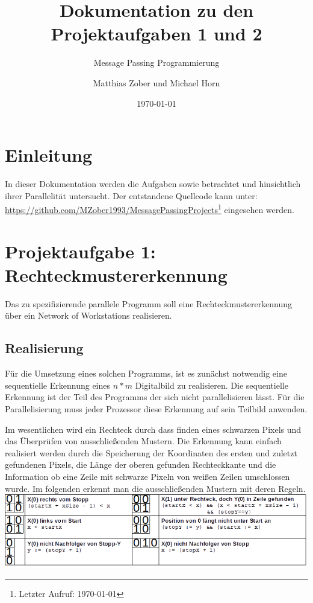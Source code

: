 	
					
\title{Dokumentation zu den Projektaufgaben 1 und 2}
\subtitle{Message Passing Programmierung}

\author{Matthias Zober und Michael Horn}
\date{\today}

\maketitle

\tableofcontents
\pagebreak

\section{Einleitung}
In dieser Dokumentation werden die Aufgaben  sowie  betrachtet und hinsichtlich ihrer Parallelität untersucht.
Der entstandene Quellcode kann unter:\\
\url{https://github.com/MZober1993/MessagePassingProjects}\footnote{Letzter Aufruf: \today}
eingesehen werden.
\section{Projektaufgabe 1: Rechteckmustererkennung}
Das zu spezifizierende parallele Programm soll eine Rechteckmustererkennung über ein Network of Workstations realisieren.
\subsection{Realisierung}

Für die Umsetzung eines solchen Programms, ist es zunächst notwendig eine sequentielle Erkennung eines $n*m$ Digitalbild zu realisieren.
Die sequentielle Erkennung ist der Teil des Programms der sich nicht parallelisieren lässt. Für die Parallelisierung muss jeder Prozessor diese Erkennung auf sein Teilbild anwenden.

Im wesentlichen wird ein Rechteck durch dass finden eines schwarzen Pixels und das Überprüfen von ausschließenden Mustern. Die Erkennung kann einfach realisiert werden durch die Speicherung der Koordinaten des ersten und zuletzt gefundenen Pixels, die Länge der oberen gefunden Rechteckkante und die Information ob eine Zeile mit schwarze Pixeln von weißen Zeilen umschlossen wurde. Im folgenden erkennt man die ausschließenden Mustern mit deren Regeln.
\includegraphics[scale=0.8]{mismatches.png}


